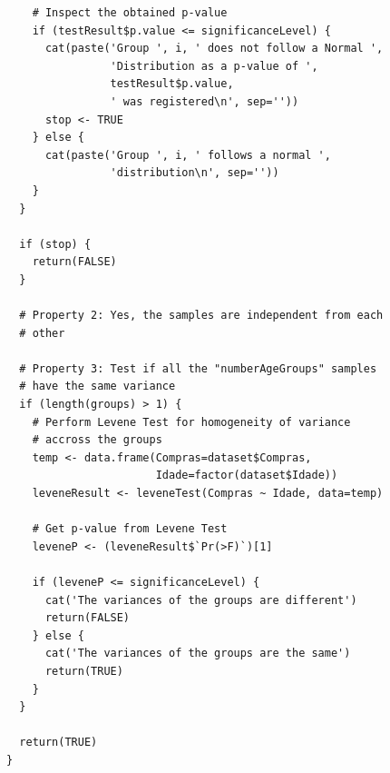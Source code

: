 \documentclass[12pt]{article}
\begin{document}
\begin{lstlisting}
    # Inspect the obtained p-value
    if (testResult$p.value <= significanceLevel) {
      cat(paste('Group ', i, ' does not follow a Normal ',
                'Distribution as a p-value of ',
                testResult$p.value,
                ' was registered\n', sep=''))
      stop <- TRUE
    } else {
      cat(paste('Group ', i, ' follows a normal ',
                'distribution\n', sep=''))
    }
  }
  
  if (stop) {
    return(FALSE) 
  }

  # Property 2: Yes, the samples are independent from each
  # other

  # Property 3: Test if all the "numberAgeGroups" samples
  # have the same variance
  if (length(groups) > 1) {
    # Perform Levene Test for homogeneity of variance
    # accross the groups
    temp <- data.frame(Compras=dataset$Compras,
                       Idade=factor(dataset$Idade))
    leveneResult <- leveneTest(Compras ~ Idade, data=temp)

    # Get p-value from Levene Test
    leveneP <- (leveneResult$`Pr(>F)`)[1]

    if (leveneP <= significanceLevel) {
      cat('The variances of the groups are different')
      return(FALSE)
    } else {
      cat('The variances of the groups are the same')
      return(TRUE)
    }
  }

  return(TRUE)
}
\end{lstlisting}
\end{document}
